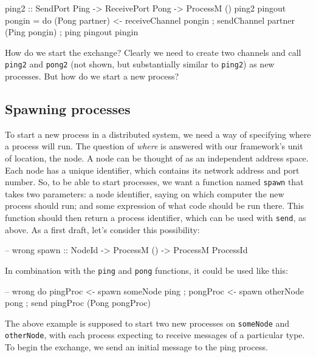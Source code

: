 \documentclass[preprint]{sigplanconf}
\begin{document}
\begin{code}
ping2 :: SendPort Ping -> ReceivePort Pong -> ProcessM ()
ping2 pingout pongin = 
   do { (Pong partner) <- receiveChannel pongin
      ; sendChannel partner (Ping pongin) 
      ; ping pingout pingin }
\end{code}

How do we start the exchange? Clearly we need to create two channels and call \texttt{ping2} and \texttt{pong2} (not shown, but substantially similar to \texttt{ping2}) as new processes. But how do we start a new process?

\subsection{Spawning processes}

To start a new process in a distributed system, we need a way of specifying where a process will run. The question of {\em where} is answered with our framework's unit of location, the node. A node can be thought of as an independent address space. Each node has a unique identifier, which contains its network address and port number. So, to be able to start processes, we want a function named \texttt{spawn} that takes two parameters: a node identifier, saying on which computer the new process should run; and some expression of what code should be run there. This function should then return a process identifier, which can be used with \texttt{send}, as above. As a first draft, let's consider this possibility:

\begin{code}
-- wrong
spawn :: NodeId -> ProcessM () -> ProcessM ProcessId
\end{code}

In combination with the \texttt{ping} and \texttt{pong} functions, it could be used like this:

\begin{code}
-- wrong
do { pingProc <- spawn someNode ping
   ; pongProc <- spawn otherNode pong
   ; send pingProc (Pong pongProc) }
\end{code}

The above example is supposed to start two new processes on \texttt{someNode} and \texttt{otherNode}, with each process expecting to receive messages of a particular type. To begin the exchange, we send an initial message to the ping process.
\end{document}
